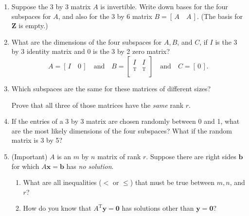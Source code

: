 \documentclass[14pt, a4paper]{article}
\begin{document}
\begin{enumerate}
    \item Suppose the 3 by 3 matrix $A$ is invertible. Write down bases for the four subspaces for $A$, and also for the 3 by 6 matrix $B = [\,A \quad A\,]$. (The basis for $\mathbf{Z}$ is empty.)

    \item What are the dimensions of the four subspaces for $A, B$, and $C$, if $I$ is the 3 by 3 identity matrix and $0$ is the 3 by 2 zero matrix?
          \[
              A = [\,I \quad 0\,] \quad \text{and} \quad
              B = \begin{bmatrix} I & I \\ ^{\mathrm{T}} & ^{\mathrm{T}} \end{bmatrix} \quad \text{and} \quad
              C = [\,0\,].
          \]

    \item Which subspaces are the same for these matrices of different sizes?
          \begin{enumerate}
          \end{enumerate}
          Prove that all three of those matrices have the \emph{same} rank $r$.

    \item If the entries of a 3 by 3 matrix are chosen randomly between 0 and 1, what are the most likely dimensions of the four subspaces? What if the random matrix is 3 by 5?

    \item (Important) $A$ is an $m$ by $n$ matrix of rank $r$. Suppose there are right sides $\boldsymbol{b}$ for which $A\boldsymbol{x} = \boldsymbol{b}$ has \emph{no solution}.
          \begin{enumerate}
              \item What are all inequalities ($<$ or $\le$) that must be true between $m, n$, and $r$?
              \item How do you know that $A^{\mathrm{T}}\boldsymbol{y} = \boldsymbol{0}$ has solutions other than $\boldsymbol{y} = \boldsymbol{0}$?
          \end{enumerate}


\end{enumerate}
\end{document}
